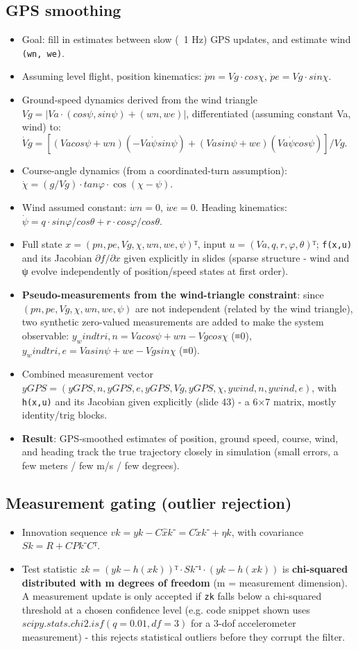 \documentclass[11pt]{article}
\begin{document}
\subsection{GPS smoothing}
\begin{itemize}
\item Goal: fill in estimates between slow (~1 Hz) GPS updates, and estimate wind \texttt{(wn, we)}.
\item Assuming level flight, position kinematics: $\dot{p}n = Vg·cosχ$, $\dot{p}e = Vg·sinχ$.
\item Ground-speed dynamics derived from the wind triangle $Vg = |Va·(cosψ,sinψ) + (wn,we)|$, differentiated (assuming constant Va, wind) to: $\dot{V}g = [(Va cosψ+wn)(-Va \dot{ψ} sinψ) + (Va sinψ+we)(Va \dot{ψ} cosψ)] / Vg$.
\item Course-angle dynamics (from a coordinated-turn assumption): $\dot{χ} = (g/Vg)·tanφ·\cos(χ-ψ)$.
\item Wind assumed constant: $\dot{w}n=0$, $\dot{w}e=0$. Heading kinematics: $\dot{ψ} = q·sinφ/cosθ + r·cosφ/cosθ$.
\item Full state $x=(pn,pe,Vg,χ,wn,we,ψ)ᵀ$, input $u=(Va,q,r,φ,θ)ᵀ$; \texttt{f(x,u)} and its Jacobian $∂f/∂x$ given explicitly in slides (sparse structure - wind and ψ evolve independently of position/speed states at first order).
\item \textbf{Pseudo-measurements from the wind-triangle constraint}: since $(pn,pe,Vg,χ,wn,we,ψ)$ are not independent (related by the wind triangle), two synthetic zero-valued measurements are added to make the system observable:
$y_windtri,n = Va cosψ + wn - Vg cosχ$ (≡0), $y_windtri,e = Va sinψ + we - Vg sinχ$ (≡0).
\item Combined measurement vector $yGPS = (yGPS,n, yGPS,e, yGPS,Vg, yGPS,χ, ywind,n, ywind,e)$, with \texttt{h(x,u)} and its Jacobian given explicitly (slide 43) - a 6×7 matrix, mostly identity/trig blocks.
\item \textbf{Result}: GPS-smoothed estimates of position, ground speed, course, wind, and heading track the true trajectory closely in simulation (small errors, a few meters / few m/s / few degrees).
\end{itemize}

\subsection{Measurement gating (outlier rejection)}
\begin{itemize}
\item Innovation sequence $vk = yk - C\hat{x}k⁻ = C\tilde{x}k⁻ + ηk$, with covariance $Sk = R + CPk⁻Cᵀ$.
\item Test statistic $zk = (yk-h(xk))ᵀ·Sk⁻¹·(yk-h(xk))$ is \textbf{chi-squared distributed with m degrees of freedom} (m = measurement dimension). A measurement update is only accepted if \texttt{zk} falls below a chi-squared threshold at a chosen confidence level (e.g. code snippet shown uses $scipy.stats.chi2.isf(q=0.01, df=3)$ for a 3-dof accelerometer measurement) - this rejects statistical outliers before they corrupt the filter.
\end{itemize}
\end{document}
